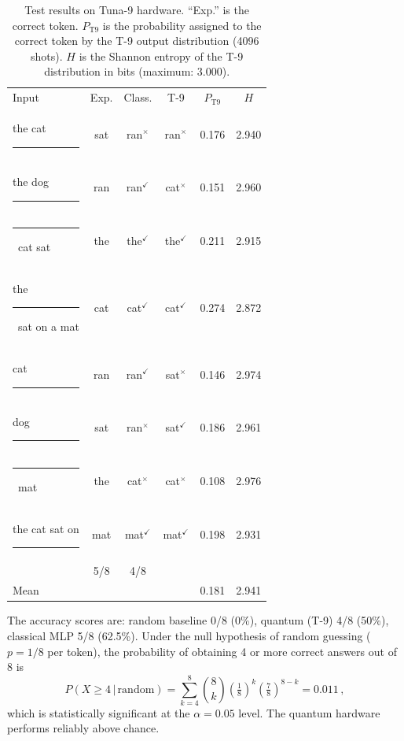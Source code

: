 \documentclass[prl,twocolumn,superscriptaddress,longbibliography,floatfix]{revtex4-2}
\begin{document}
\begin{table}[!htbp]
\caption{\label{tab:results}Test results on Tuna-9 hardware. ``Exp.'' is the correct token. $P_{\mathrm{T9}}$ is the probability assigned to the correct token by the T-9 output distribution (4096 shots). $H$ is the Shannon entropy of the T-9 distribution in bits (maximum: 3.000).}
\begin{ruledtabular}
\begin{tabular}{lccccc}
Input & Exp. & Class. & T-9 & $P_{\mathrm{T9}}$ & $H$ \\
\colrule
the cat \rule{1em}{0.4pt}            & sat & ran$^\times$  & ran$^\times$  & 0.176 & 2.940 \\
the dog \rule{1em}{0.4pt}            & ran & ran$^\checkmark$ & cat$^\times$  & 0.151 & 2.960 \\
\rule{1em}{0.4pt}\, cat sat          & the & the$^\checkmark$ & the$^\checkmark$ & 0.211 & 2.915 \\
the \rule{1em}{0.4pt}\, sat on a mat & cat & cat$^\checkmark$ & cat$^\checkmark$ & 0.274 & 2.872 \\
cat \rule{1em}{0.4pt}                & ran & ran$^\checkmark$ & sat$^\times$  & 0.146 & 2.974 \\
dog \rule{1em}{0.4pt}                & sat & ran$^\times$  & sat$^\checkmark$ & 0.186 & 2.961 \\
\rule{1em}{0.4pt}\, mat              & the & cat$^\times$  & cat$^\times$  & 0.108 & 2.976 \\
the cat sat on \rule{1em}{0.4pt}     & mat & mat$^\checkmark$ & mat$^\checkmark$ & 0.198 & 2.931 \\
\colrule
\multicolumn{2}{l}{Accuracy} & 5/8 & 4/8 &  &  \\
\multicolumn{2}{l}{Mean} &  &  & 0.181 & 2.941 \\
\end{tabular}
\end{ruledtabular}
\end{table}

The accuracy scores are: random baseline 0/8 (0\%), quantum (T-9) 4/8 (50\%), classical MLP 5/8 (62.5\%). Under the null hypothesis of random guessing ($p = 1/8$ per token), the probability of obtaining 4 or more correct answers out of 8 is
\begin{equation}
  P(X \geq 4 \,|\, \text{random}) = \sum_{k=4}^{8}\binom{8}{k}\left(\tfrac{1}{8}\right)^k\left(\tfrac{7}{8}\right)^{8-k} = 0.011\,,
\end{equation}
which is statistically significant at the $\alpha = 0.05$ level. The quantum hardware performs reliably above chance.
\end{document}
